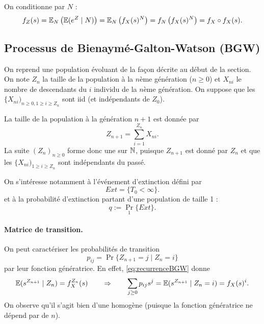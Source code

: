 \proof
On conditionne par $N$ :
\begin{align*}
  f_Z(s) 
  = \operatorname{\mathbb{E}}_N \left(\operatorname{\mathbb{E}}(e^Z \mid N) \right)
  = \operatorname{\mathbb{E}}_N \left(f_X(s)^N \right)
  = f_N \left(f_X(s)^N \right) = f_X \circ f_X(s).
\end{align*}

\eproof

\subsection{Processus de Bienaymé-Galton-Watson (BGW)} 

On reprend une population évoluant de la façon décrite au début de la section. 
On note $Z_n$ la taille de la population à la $n$ème génération ($n \geq 0$) et $X_{ni}$ le nombre de descendants du $i$ individu de la $n$ème génération. 
On suppose que les $\{X_{ni})_{n \geq 0, 1 \geq i \geq Z_n}$ sont iid (et indépendants de $Z_0$).

\bigskip
La taille de la population à la génération $n+1$ est donnée par 
\begin{equation} \label{eq:recurrenceBGW}
Z_{n+1} = \sum_{i = 1}^{Z_n} X_{ni}.
\end{equation}
La suite $(Z_n)_{n \geq 0}$ forme donc une \cM sur $\mathbb{N}$, puisque $Z_{n+1}$ est donné par $Z_n$ et que les $\{X_{ni})_{1 \geq i \geq Z_n}$ sont indépendants du passé.

\bigskip
On s'intéresse notamment à l'événement d'extinction défini par 
$$
Ext = \{T_0 < \infty\}.
$$
et à la probabilité d'extinction partant d'une population de taille 1 : 
$$
q := \Pr_1\{Ext\}.
$$


\paragraph*{Matrice de transition.} 
On peut caractériser les probabilités de transition 
$$
p_{ij} = \Pr\{Z_{n+1} = j \mid Z_n = i\}
$$
par leur fonction génératrice. En effet, \eqref{eq:recurrenceBGW} donne
$$
\operatorname{\mathbb{E}}(s^{Z_{n+1}} \mid Z_n) = f_X^{Z_n}(s)
\qquad \Rightarrow \qquad 
\sum_{j \geq 0} p_{ij} s^j = \operatorname{\mathbb{E}}(s^{Z_{n+1}} \mid Z_n=i) = f_X(s)^i.
$$
On observe qu'il s'agit bien d'une \cM homogène (puisque la fonction génératrice ne dépend par de $n$).

